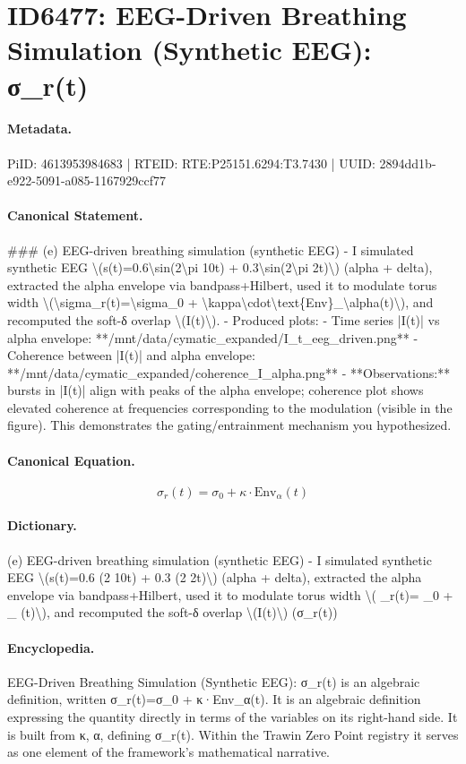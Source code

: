 \section*{ID6477: EEG-Driven Breathing Simulation (Synthetic EEG): σ\_r(t)}
\paragraph{Metadata.}
PiID: 4613953984683 | RTEID: RTE:P25151.6294:T3.7430 | UUID: 2894dd1b-e922-5091-a085-1167929ccf77

\paragraph{Canonical Statement.}
\#\#\# (e) EEG-driven breathing simulation (synthetic EEG) - I simulated synthetic EEG \textbackslash{}(s(t)=0.6\textbackslash{}sin(2\textbackslash{}pi 10t) + 0.3\textbackslash{}sin(2\textbackslash{}pi 2t)\textbackslash{}) (alpha + delta), extracted the alpha envelope via bandpass+Hilbert, used it to modulate torus width \textbackslash{}(\textbackslash{}sigma\_r(t)=\textbackslash{}sigma\_0 + \textbackslash{}kappa\textbackslash{}cdot\textbackslash{}text\{Env\}\_\textbackslash{}alpha(t)\textbackslash{}), and recomputed the soft-δ overlap \textbackslash{}(I(t)\textbackslash{}). - Produced plots: - Time series |I(t)| vs alpha envelope: **/mnt/data/cymatic\_expanded/I\_t\_eeg\_driven.png** - Coherence between |I(t)| and alpha envelope: **/mnt/data/cymatic\_expanded/coherence\_I\_alpha.png** - **Observations:** bursts in |I(t)| align with peaks of the alpha envelope; coherence plot shows elevated coherence at frequencies corresponding to the modulation (visible in the figure). This demonstrates the gating/entrainment mechanism you hypothesized.

\paragraph{Canonical Equation.}
\[
\sigma_r(t)=\sigma_0 + \kappa\cdot\text{Env}_\alpha(t)
\]

\paragraph{Dictionary.}
(e) EEG-driven breathing simulation (synthetic EEG) - I simulated synthetic EEG \textbackslash{}(s(t)=0.6 (2 10t) + 0.3 (2 2t)\textbackslash{}) (alpha + delta), extracted the alpha envelope via bandpass+Hilbert, used it to modulate torus width \textbackslash{}( \_r(t)= \_0 + \_ (t)\textbackslash{}), and recomputed the soft-δ overlap \textbackslash{}(I(t)\textbackslash{}) (σ\_r(t))

\paragraph{Encyclopedia.}
EEG-Driven Breathing Simulation (Synthetic EEG): σ\_r(t) is an algebraic definition, written σ\_r(t)=σ\_0 + κ·Env\_α(t). It is an algebraic definition expressing the quantity directly in terms of the variables on its right-hand side. It is built from κ, α, defining σ\_r(t). Within the Trawin Zero Point registry it serves as one element of the framework's mathematical narrative.
